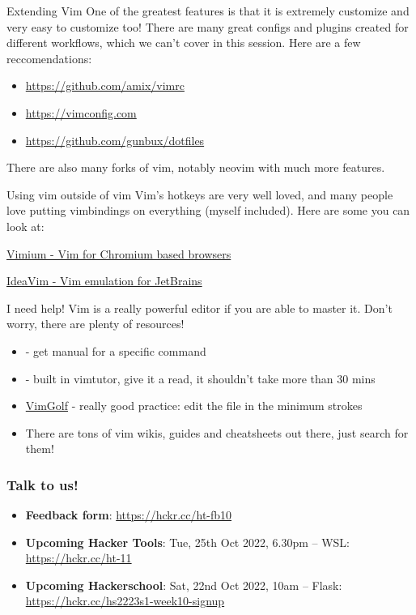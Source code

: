 \documentclass[12pt]{beamer}
\begin{document}
\begin{frame}{Extending Vim}
    One of the greatest features is that it is extremely customize and very easy to customize too!
    There are many great configs and plugins created for different workflows, which we can't cover in this
    session. Here are a few reccomendations:
    \begin{itemize}
        \item \url{https://github.com/amix/vimrc}
        \item \url{https://vimconfig.com}
        \item \url{https://github.com/gunbux/dotfiles}
    \end{itemize}{}
    There are also many forks of vim, notably neovim with much more features.
\end{frame}{}

\begin{frame}{Using vim outside of vim}
    Vim's hotkeys are very well loved, and many people love putting vimbindings on everything (myself included).
    Here are some you can look at:
    \item \href{https://chrome.google.com/webstore/detail/vimium/dbepggeogbaibhgnhhndojpepiihcmeb?hl=en}{Vimium - Vim for Chromium based browsers}
    \item \href{https://plugins.jetbrains.com/plugin/164-ideavim}{IdeaVim - Vim emulation for JetBrains}
\end{frame}{}

\begin{frame}{I need help!}
    Vim is a really powerful editor if you are able to master it. Don't worry, there are plenty of resources!
    \begin{itemize}
        \item {} - get manual for a specific command
        \item {} - built in vimtutor, give it a read, it shouldn't take more than 30 mins
        \item \href{https://www.vimgolf.com}{VimGolf} - really good practice: edit the file in the minimum strokes
        \item There are tons of vim wikis, guides and cheatsheets out there, just search for them!
    \end{itemize}{}
\end{frame}{}

\begin{frame}
  \frametitle{Talk to us!}
  \begin{itemize}
    \item \textbf{Feedback form}: \url{https://hckr.cc/ht-fb10}
    \item \textbf{Upcoming Hacker Tools}:
          Tue, 25th Oct 2022, 6.30pm -- WSL: \url{https://hckr.cc/ht-11}
          
    \item \textbf{Upcoming Hackerschool}:
          Sat, 22nd Oct 2022, 10am -- Flask: \url{https://hckr.cc/hs2223s1-week10-signup}
  \end{itemize}
\end{frame}
\end{document}
